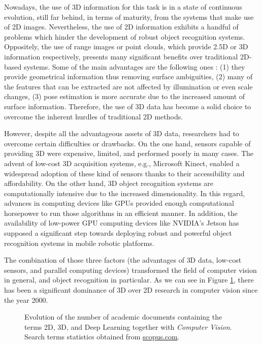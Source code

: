 Nowadays, the use of \acs{3D} information for this task is in a state of continuous evolution, still far behind, in terms of maturity, from the systems that make use of \acs{2D} images. Nevertheless, the use of \acs{2D} information exhibits a handful of problems which hinder the development of robust object recognition systems. Oppositely, the use of range images or point clouds, which provide \acs{2.5D} or \acs{3D} information respectively, presents many significant benefits over traditional \acs{2D}-based systems. Some of the main advantages are the following ones \cite{Guo2014}: (1) they provide geometrical information thus removing surface ambiguities, (2) many of the features that can be extracted are not affected by illumination or even scale changes, (3) pose estimation is more accurate due to the increased amount of surface information. Therefore, the use of \acs{3D} data has become a solid choice to overcome the inherent hurdles of traditional \acs{2D} methods.

However, despite all the advantageous assets of \acs{3D} data, researchers had to overcome certain difficulties or drawbacks. On the one hand, sensors capable of providing \acs{3D} were expensive, limited, and performed poorly in many cases. The advent of low-cost \acs{3D} acquisition systems, e.g., Microsoft Kinect, enabled a widespread adoption of these kind of sensors thanks to their accessibility and affordability. On the other hand, \acs{3D} object recognition systems are computationally intensive due to the increased dimensionality. In this regard, advances in computing devices like \acp{GPU} provided enough computational horsepower to run those algorithms in an efficient manner. In addition, the availability of low-power \acs{GPU} computing devices like NVIDIA's Jetson has supposed a significant step towards deploying robust and powerful object recognition systems in mobile robotic platforms.

The combination of those three factors (the advantages of \acs{3D} data, low-cost sensors, and parallel computing devices) transformed the field of computer vision in general, and object recognition in particular. As we can see in Figure \ref{fig:terms_statistics}, there has been a significant dominance of \acs{3D} over \acs{2D} research in computer vision since the year 2000.

\clearpage

\begin{figure}[!t]
	
	\caption{Evolution of the number of academic documents containing the terms 2D, 3D, and Deep Learning together with \emph{Computer Vision}. Search terms statistics obtained from \href{http://www.scopus.com/}{scopus.com}.}
	\label{fig:terms_statistics}
\end{figure}

